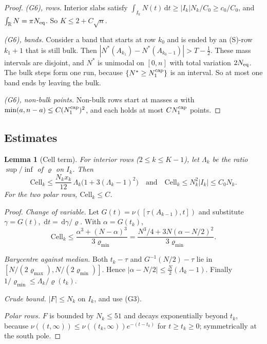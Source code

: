 \documentclass[11pt]{article}
\newtheorem{lemma}[theorem]{Lemma}
\theoremstyle{definition}
\theoremstyle{remark}
\newcommand{\R}{\mathbb R}
\newcommand{\dd}{\,\mathrm d}
\begin{document}
\begin{proof}
\emph{(G6), rows.} Interior slabs satisfy $\int_{I_k}N(t)\dd t\ge|I_k|N_k/C_0\ge c_0/C_0$, and
$\int_\R N=\pi N_{\rm eq}$. So $K\le2+C\sqrt n$.

\emph{(G6), bands.} Consider a band that starts at row $k_0$ and is ended by an (S)-row $k_1+1$
that is still bulk. Then $|N^*(A_{k_1})-N^*(A_{k_0-1})|>T-\tfrac12$. These mass intervals are
disjoint, and $N^*$ is unimodal on $[0,n]$ with total variation $2N_{\rm eq}$. The bulk steps
form one run, because $\{N^*\ge N_1^{\rm cap}\}$ is an interval. So at most one band ends by
leaving the bulk.

\emph{(G6), non-bulk points.} Non-bulk rows start at masses $a$ with
$\min(a,n-a)\le C(N_1^{\rm cap})^2$, and each holds at most $CN_1^{\rm cap}$ points.
\end{proof}

\subsection{Estimates}

\begin{lemma}[Cell term]\label{lem:cell}
For interior rows ($2\le k\le K-1$), let $\Lambda_k$ be the ratio $\sup/\inf$ of $\varrho$ on $I_k$.
Then
\[
\mathrm{Cell}_k\le\frac{N_kx_k}{12}\,\Lambda_k\bigl(1+3(\Lambda_k-1)^2\bigr)
\quad\text{and}\quad
\mathrm{Cell}_k\le N_k^2|I_k|\le C_0N_k .
\]
For the two polar rows, $\mathrm{Cell}_k\le C$.
\end{lemma}
\begin{proof}
\emph{Change of variable.} Let $G(t)=\nu([\tau(A_{k-1}),t])$ and substitute $\gamma=G(t)$,
$\dd t=\dd\gamma/\varrho$. With $\alpha=G(t_k)$,
\[
\mathrm{Cell}_k\le\frac{\alpha^3+(N-\alpha)^3}{3\varrho_{\min}}
=\frac{N^3/4+3N(\alpha-N/2)^2}{3\varrho_{\min}} .
\]

\emph{Barycentre against median.} Both $t_k-\tau$ and $G^{-1}(N/2)-\tau$ lie in
$[N/(2\varrho_{\max}),N/(2\varrho_{\min})]$. Hence $|\alpha-N/2|\le\tfrac N2(\Lambda_k-1)$.
Finally $1/\varrho_{\min}\le\Lambda_k/\varrho(t_k)$.

\emph{Crude bound.} $|F|\le N_k$ on $I_k$, and use (G3).

\emph{Polar rows.} $F$ is bounded by $N_k\le51$ and decays exponentially beyond $t_k$, because
$\nu((t,\infty))\le\nu((t_k,\infty))e^{-(t-t_k)}$ for $t\ge t_k\ge0$; symmetrically at the south
pole.
\end{proof}
\end{document}
